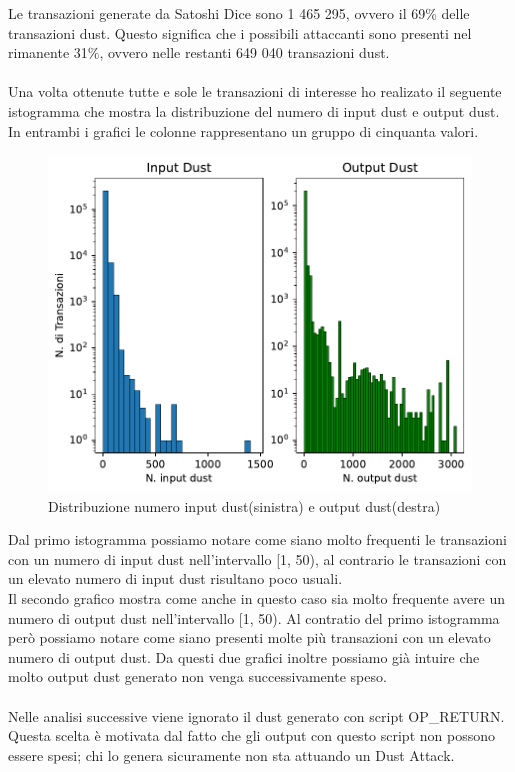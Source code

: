 Le transazioni generate da Satoshi Dice sono 1 465 295, ovvero il 69\% delle transazioni dust. Questo significa che i possibili attaccanti sono presenti nel rimanente 31\%, ovvero nelle restanti 649 040 transazioni dust.\\\\
Una volta ottenute tutte e sole le transazioni di interesse ho realizato il seguente istogramma che mostra la distribuzione del numero di input dust e output dust. In entrambi i grafici le colonne rappresentano un gruppo di cinquanta valori.
\begin{figure}[h!]
    \centering
    \includegraphics[scale=1]{Grafici/distribuzione_dust.pdf}
    \caption{Distribuzione numero input dust(sinistra) e output dust(destra)}
    \label{fig:dust_distribuzione}
\end{figure}
\FloatBarrier 
Dal primo istogramma possiamo notare come siano molto frequenti le transazioni con un numero di input dust nell'intervallo [1, 50), al contrario le transazioni con un elevato numero di input dust risultano poco usuali.\\
Il secondo grafico mostra come anche in questo caso sia molto frequente avere un numero di output dust nell'intervallo [1, 50). Al contratio del primo istogramma però possiamo notare come siano presenti molte più transazioni con un elevato numero di output dust. Da questi due grafici inoltre possiamo già intuire che molto output dust generato non venga successivamente speso.\\\\ 
Nelle analisi successive viene ignorato il dust generato con script OP\_RETURN. Questa scelta è motivata dal fatto che gli output con questo script non possono essere spesi; chi lo genera sicuramente non sta attuando un Dust Attack.\\
